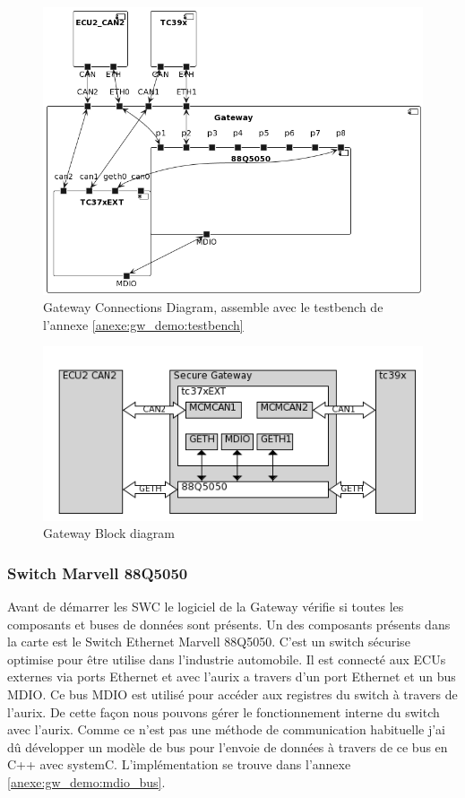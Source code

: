 \begin{figure}[!htb] 
    \centering 
    \includegraphics[width=\textwidth]{img/GWConnectionsDiagram.png} 
    \caption{Gateway Connections Diagram, assemble avec le testbench de l'annexe \ref{anexe:gw_demo:testbench}} 
    \label{fig:connections-diagram} 
\end{figure} 

\begin{figure}[!htb] 
\centering 
\includegraphics[width=\textwidth]{img/gateway_block_diagram.png} 
\caption{Gateway Block diagram} 
\label{fig:block diagram} 
\end{figure} 


\subsubsection{Switch Marvell 88Q5050} 

Avant de démarrer les SWC le logiciel de la Gateway vérifie si toutes les composants et buses de données sont présents. Un des composants présents dans la carte est le Switch Ethernet Marvell 88Q5050\cite{sw88Q5050}. C'est un switch sécurise optimise pour être utilise dans l'industrie automobile. Il est connecté aux ECUs externes via ports Ethernet et avec l'aurix a travers d'un port Ethernet et un bus MDIO\cite{mdio-background}. Ce bus MDIO est utilisé pour accéder aux registres du switch à travers de l'aurix. De cette façon nous pouvons gérer le fonctionnement interne du switch avec l'aurix. Comme ce n'est pas une méthode de communication habituelle j'ai dû développer un modèle de bus pour l'envoie de données \`a travers de ce bus en C++ avec systemC. L'implémentation se trouve dans l'annexe \ref{anexe:gw_demo:mdio_bus}. 

